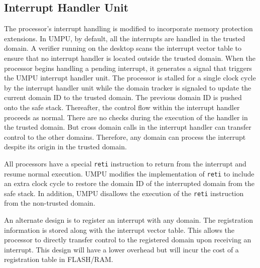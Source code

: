 \subsection{Interrupt Handler Unit}
\label{sec:umpuintr}
%
The processor's interrupt handling is modified to incorporate memory
protection extensions.
%
In UMPU, by default, all the interrupts are handled in the trusted domain.
%
A verifier running on the desktop scans the interrupt vector table to
ensure that no interrupt handler is located outside the trusted
domain.
%
When the processor begins handling a pending interrupt, it generates a
signal that triggers the UMPU interrupt handler unit.
%
The processor is stalled for a single clock cycle by the interrupt
handler unit while the domain tracker is signaled to update the current
domain ID to the trusted domain.
%
The previous domain ID is pushed onto the safe stack.
%
Thereafter, the control flow within the interrupt handler proceeds as
normal.
%
There are no checks during the execution of the handler in the trusted
domain.
%
But cross domain calls in the interrupt handler can transfer control
to the other domains.
%
Therefore, any domain can process the interrupt despite its origin in
the trusted domain.
%

All processors have a special \texttt{reti} instruction to return from
the interrupt and resume normal execution.
%
UMPU modifies the implementation of \texttt{reti} to include an extra
clock cycle to restore the domain ID of the interrupted domain from
the safe stack.
%
In addition, UMPU disallows the execution of the \texttt{reti} instruction from the non-trusted domain.

An alternate design is to register an interrupt with any
domain.
%
The registration information is stored along with the interrupt
vector table.
%
This allows the processor to directly transfer control to the registered domain
upon receiving an interrupt.
%
This design will have a lower overhead but will incur the cost of a
registration table in FLASH/RAM.

